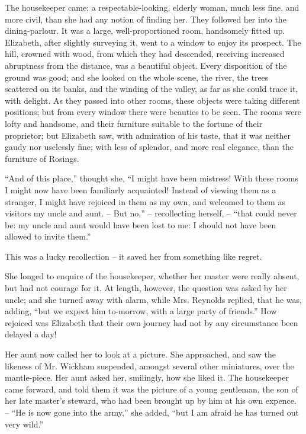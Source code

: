 The housekeeper came; a respectable-looking, elderly
woman, much less fine, and more civil, than she had any
notion of finding her. They followed her into the dining-parlour.
It was a large, well-proportioned room, handsomely
fitted up. Elizabeth, after slightly surveying it,
went to a window to enjoy its prospect. The hill, crowned
with wood, from which they had descended, receiving
increased abruptness from the distance, was a beautiful
object. Every disposition of the ground was good; and
she looked on the whole scene, the river, the trees scattered
on its banks, and the winding of the valley, as far as she
could trace it, with delight. As they passed into other
rooms, these objects were taking different positions; but
from every window there were beauties to be seen. The
rooms were lofty and handsome, and their furniture
suitable to the fortune of their proprietor; but Elizabeth
saw, with admiration of his taste, that it was neither
gaudy nor uselessly fine; with less of splendor, and more
real elegance, than the furniture of Rosings.

“And of this place,” thought she, “I might have been
mistress! With these rooms I might now have been
familiarly acquainted! Instead of viewing them as a
stranger, I might have rejoiced in them as my own, and
welcomed to them as visitors my uncle and aunt. -- But
no,” -- recollecting herself, -- “that could never be: my
uncle and aunt would have been lost to me: I should
not have been allowed to invite them.”

This was a lucky recollection -- it saved her from something
like regret.

She longed to enquire of the housekeeper, whether her
master were really absent, but had not courage for it.
At length, however, the question was asked by her uncle;
and she turned away with alarm, while Mrs. Reynolds
replied, that he was, adding, “but we expect him
to-morrow, with a large party of friends.” How rejoiced
was Elizabeth that their own journey had not by any
circumstance been delayed a day!

Her aunt now called her to look at a picture. She
approached, and saw the likeness of Mr. Wickham suspended,
amongst several other miniatures, over the mantle-piece.
Her aunt asked her, smilingly, how she liked it.
The housekeeper came forward, and told them it was the
picture of a young gentleman, the son of her late master’s
steward, who had been brought up by him at his own
expence. -- “He is now gone into the army,” she added,
“but I am afraid he has turned out very wild.”

